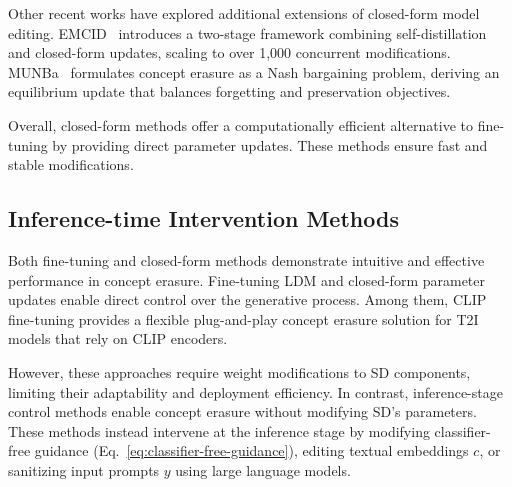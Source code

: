 Other recent works have explored additional extensions of closed-form model editing. EMCID~\cite{Xiong2024EditingMC} introduces a two-stage framework combining self-distillation and closed-form updates, scaling to over 1,000 concurrent modifications. MUNBa~\cite{Wu2024MUNBaMU} formulates concept erasure as a Nash bargaining problem, deriving an equilibrium update that balances forgetting and preservation objectives.

Overall, closed-form methods offer a computationally efficient alternative to fine-tuning by providing direct parameter updates. These methods ensure fast and stable modifications. 









\subsection{Inference-time Intervention Methods} \label{subsec:inference}
Both fine-tuning and closed-form methods demonstrate intuitive and effective performance in concept erasure. Fine-tuning LDM and closed-form parameter updates enable direct control over the generative process.
Among them,  CLIP fine-tuning provides a flexible plug-and-play concept erasure solution for T2I models that rely on CLIP encoders.

However, these approaches require weight modifications to SD components, limiting their adaptability and deployment efficiency. In contrast, inference-stage control methods enable concept erasure without modifying SD’s parameters. These methods instead intervene at the inference stage by modifying classifier-free guidance (Eq.~\eqref{eq:classifier-free-guidance}), editing textual embeddings \( c \), or sanitizing input prompts \( y \) using large language models.


